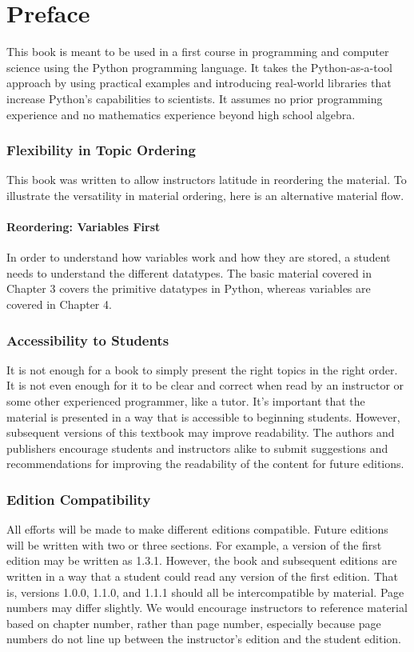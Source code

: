 \chapter*{Preface}
This book is meant to be used in a first course in programming and computer science using the Python programming language. It takes the Python-as-a-tool approach by using practical examples and introducing real-world libraries that increase Python's capabilities to scientists. It assumes no prior programming experience and no mathematics experience beyond high school algebra.
\subsection*{Flexibility in Topic Ordering}
This book was written to allow instructors latitude in reordering the material. To illustrate the versatility in material ordering, here is an alternative material flow.
\subsubsection*{Reordering: Variables First}
In order to understand how variables work and how they are stored, a student needs to understand the different datatypes. The basic material covered in Chapter 3 covers the primitive datatypes in Python, whereas variables are covered in Chapter 4.
\subsection*{Accessibility to Students}
It is not enough for a book to simply present the right topics in the right order. It is not even enough for it to be clear and correct when read by an instructor or some other experienced programmer, like a tutor. It's important that the material is presented in a way that is accessible to beginning students. However, subsequent versions of this textbook may improve readability. The authors and publishers encourage students and instructors alike to submit suggestions and recommendations for improving the readability of the content for future editions.
\subsection*{Edition Compatibility}
All efforts will be made to make different editions compatible. Future editions will be written with two or three sections. For example, a version of the first edition may be written as 1.3.1. However, the book and subsequent editions are written in a way that a student could read any version of the first edition. That is, versions 1.0.0, 1.1.0, and 1.1.1 should all be intercompatible by material. Page numbers may differ slightly. We would encourage instructors to reference material based on chapter number, rather than page number, especially because page numbers do not line up between the instructor's edition and the student edition.\par

